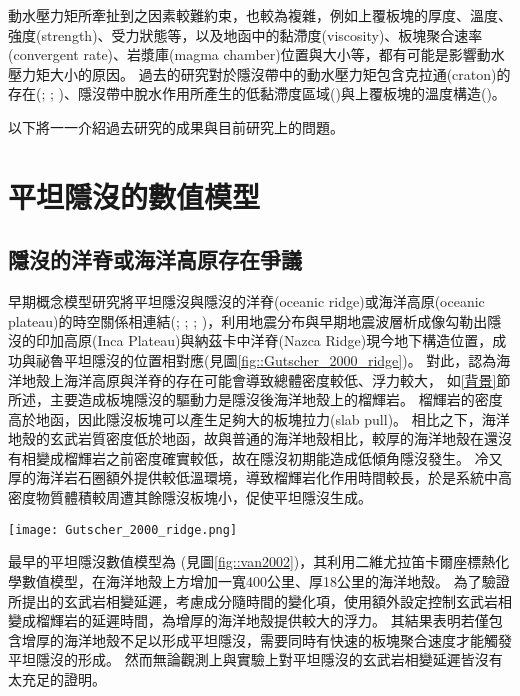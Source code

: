 動水壓力矩所牽扯到之因素較難約束，也較為複雜，例如上覆板塊的厚度、溫度、強度(strength)、受力狀態等，以及地函中的黏滯度(viscosity)、板塊聚合速率(convergent rate)、岩漿庫(magma chamber)位置與大小等，都有可能是影響動水壓力矩大小的原因。
過去的研究對於隱沒帶中的動水壓力矩包含克拉通(craton)的存在(\citealp{Manea2012Chile}; \citealp{Liu2016}; \citealp{Hu2016})、隱沒帶中脫水作用所產生的低黏滯度區域(\citealp{Manea2007})與上覆板塊的溫度構造(\citealp{Thermal2012})。

以下將一一介紹過去研究的成果與目前研究上的問題。

\section{平坦隱沒的數值模型}\label{平坦隱沒的數值模型}
\subsection{隱沒的洋脊或海洋高原存在爭議}\label{隱沒的洋脊或海洋高原存在爭議}
早期概念模型研究將平坦隱沒與隱沒的洋脊(oceanic ridge)或海洋高原(oceanic plateau)的時空關係相連結(\citealp{pilger1981plate}; \citealp{henderson1984mesozoic}; \citealp{Gutscher2000A}; \citealp{gutscher2002andean})，\citealp{Gutscher2000A}利用地震分布與早期地震波層析成像勾勒出隱沒的印加高原(Inca Plateau)與納茲卡中洋脊(Nazca Ridge)現今地下構造位置，成功與祕魯平坦隱沒的位置相對應(見圖\ref{fig::Gutscher_2000_ridge})。
對此，\citealp{Gutscher2000A}認為海洋地殼上海洋高原與洋脊的存在可能會導致總體密度較低、浮力較大，
如\ref{背景}節所述，主要造成板塊隱沒的驅動力是隱沒後海洋地殼上的榴輝岩。
榴輝岩的密度高於地函，因此隱沒板塊可以產生足夠大的板塊拉力(slab pull)。
相比之下，海洋地殼的玄武岩質密度低於地函，故與普通的海洋地殼相比，較厚的海洋地殼在還沒有相變成榴輝岩之前密度確實較低，故在隱沒初期能造成低傾角隱沒發生。
冷又厚的海洋岩石圈額外提供較低溫環境，導致榴輝岩化作用時間較長，於是系統中高密度物質體積較周遭其餘隱沒板塊小，促使平坦隱沒生成。

\begin{figure*}[htp]
    \centering
    \texttt{[image: Gutscher\_2000\_ridge.png]}
    \caption[南美洲板塊構造圖，摘自\citealp{Gutscher2000A}]{南美洲板塊構造圖，摘自\citealp{Gutscher2000A}。粗黑線標出平坦隱沒段，灰色陰影區標示隱沒的海洋高原與洋脊，三角形為活動火山。板塊聚合速率由白色箭頭標出，數值參考自\citealp{demets1990current}。
    }
    \label{fig::Gutscher_2000_ridge}
\end{figure*}

最早的平坦隱沒數值模型為\citealp{van2002role} (見圖\ref{fig::van2002})，其利用二維尤拉笛卡爾座標熱化學數值模型，在海洋地殼上方增加一寬400公里、厚18公里的海洋地殼。
為了驗證\citealp{Gutscher2000A}所提出的玄武岩相變延遲，\citealp{van2002role}考慮成分隨時間的變化項，使用額外設定控制玄武岩相變成榴輝岩的延遲時間，為增厚的海洋地殼提供較大的浮力。
其結果表明若僅包含增厚的海洋地殼不足以形成平坦隱沒，需要同時有快速的板塊聚合速度才能觸發平坦隱沒的形成。
然而無論觀測上與實驗上對平坦隱沒的玄武岩相變延遲皆沒有太充足的證明。

